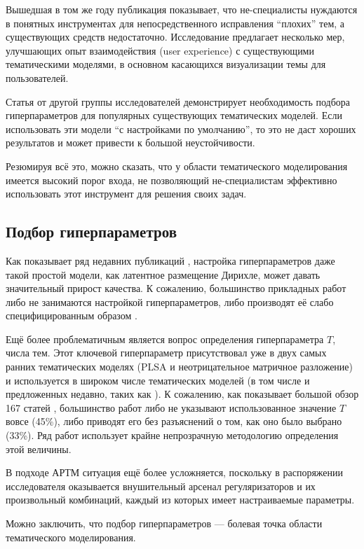 Вышедшая в том же году публикация \cite{lee2017human} показывает, что не-специалисты нуждаются в понятных инструментах для непосредственного исправления ``плохих'' тем, а существующих средств недостаточно. Исследование предлагает несколько мер, улучшающих опыт взаимодействия (user experience) с существующими тематическими моделями, в основном касающихся визуализации темы для пользователей.

Статья от другой группы исследователей \cite{agrawal2018wrong} демонстрирует необходимость подбора гиперпараметров для популярных существующих тематических моделей. Если использовать эти модели ``с настройками по умолчанию'', то это не даст хороших результатов и может привести к большой неустойчивости.

Резюмируя всё это, можно сказать, что у области тематического моделирования имеется высокий порог входа, не позволяющий не-специалистам эффективно использовать этот инструмент для решения своих задач.

\subsection{Подбор гиперпараметров}

Как показывает ряд недавних публикаций \cite{agrawal2018wrong,fan2019assessing}, настройка гиперпараметров даже такой простой модели, как латентное размещение Дирихле, может давать значительный прирост качества. К сожалению, большинство прикладных работ либо не занимаются настройкой гиперпараметров, либо производят её слабо специфицированным образом \cite{agrawal2018wrong}.

Ещё более проблематичным является вопрос определения гиперпараметра $T$, числа тем. Этот ключевой гиперпараметр присутствовал уже в двух самых ранних тематических моделях (PLSA и неотрицательное матричное разложение) и используется в широком числе тематических моделей (в том числе и предложенных недавно, таких как \cite{zosa-granroth-wilding-2019-multilingual}). К сожалению, как показывает большой обзор 167 статей \cite{chen2016survey}, большинство работ либо не указывают использованное значение $T$ вовсе (45\%), либо приводят его без разъяснений о том, как оно было выбрано (33\%). Ряд работ использует крайне непрозрачную методологию определения этой величины.

В подходе АРТМ ситуация ещё более усложняется, поскольку в распоряжении исследователя оказывается внушительный арсенал регуляризаторов и их произвольный комбинаций, каждый из которых имеет настраиваемые параметры.

Можно заключить, что подбор гиперпараметров --- болевая точка области тематического моделирования.


